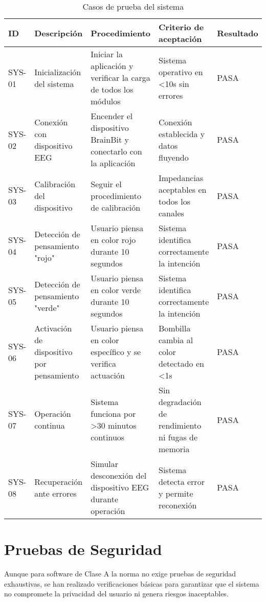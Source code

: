 \begin{table}[ht]
    \centering
    \begin{tabular}{|p{1cm}|p{3.5cm}|p{3.5cm}|p{3.5cm}|p{1.5cm}|}
        \hline
        \textbf{ID} & \textbf{Descripción} & \textbf{Procedimiento} & \textbf{Criterio de aceptación} & \textbf{Resultado} \\
        \hline
        SYS-01 & Inicialización del sistema & Iniciar la aplicación y verificar la carga de todos los módulos & Sistema operativo en <10s sin errores & PASA \\
        \hline
        SYS-02 & Conexión con dispositivo EEG & Encender el dispositivo BrainBit y conectarlo con la aplicación & Conexión establecida y datos fluyendo & PASA \\
        \hline
        SYS-03 & Calibración del dispositivo & Seguir el procedimiento de calibración & Impedancias aceptables en todos los canales & PASA \\
        \hline
        SYS-04 & Detección de pensamiento "rojo" & Usuario piensa en color rojo durante 10 segundos & Sistema identifica correctamente la intención & PASA \\
        \hline
        SYS-05 & Detección de pensamiento "verde" & Usuario piensa en color verde durante 10 segundos & Sistema identifica correctamente la intención & PASA \\
        \hline
        SYS-06 & Activación de dispositivo por pensamiento & Usuario piensa en color específico y se verifica actuación & Bombilla cambia al color detectado en <1s & PASA \\
        \hline
        SYS-07 & Operación continua & Sistema funciona por >30 minutos continuos & Sin degradación de rendimiento ni fugas de memoria & PASA \\
        \hline
        SYS-08 & Recuperación ante errores & Simular desconexión del dispositivo EEG durante operación & Sistema detecta error y permite reconexión & PASA \\
        \hline
    \end{tabular}
    \caption{Casos de prueba del sistema}
    \label{tab:system_tests}
\end{table}



\section{Pruebas de Seguridad}

Aunque para software de Clase A la norma no exige pruebas de seguridad exhaustivas, se han realizado verificaciones básicas para garantizar que el sistema no compromete la privacidad del usuario ni genera riesgos inaceptables.

